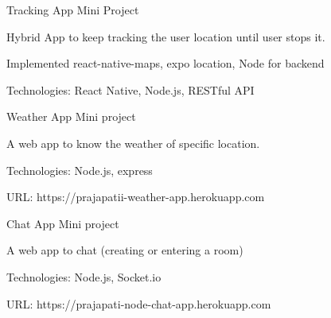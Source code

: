 \begin{cventries}
    \cventry
    {} %
    {Tracking App} %
    {Mini Project} %
    {} %
    {
      \begin{cvitems} %
      	\item {Hybrid App to keep tracking the user location until user stops it.}
      	\item{Implemented react-native-maps, expo location, Node for backend }
      	\item {Technologies: React Native, Node.js, RESTful API}
    \end{cvitems}
    }
    
    
  \cventry
    {} %
    {Weather App} %
    {Mini project} %
    {} %
    {
      \begin{cvitems} %
      	\item {A web app to know the weather of specific location. }
      	\item {Technologies: Node.js, express}
      	\item {URL: https://prajapatii-weather-app.herokuapp.com}
      \end{cvitems}
    }

    \cventry
    {} %
    {Chat App} %
    {Mini project} %
    {} %
    {
      \begin{cvitems} %
      	\item {A web app to chat (creating or entering a room) }
      	\item {Technologies: Node.js, Socket.io}
      	\item {URL: https://prajapati-node-chat-app.herokuapp.com}
      \end{cvitems}
    }
    
\end{cventries}